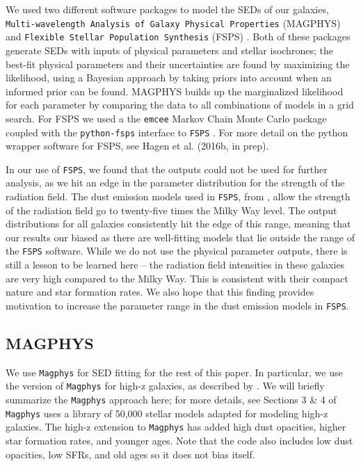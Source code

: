 \documentclass[preprint,natbib209]{aastex}
\begin{document}
We used two different software packages to model the SEDs of our galaxies, \texttt{Multi-wavelength Analysis of Galaxy Physical Properties} (MAGPHYS) \citep{dacunha08, dacunha15} and \texttt{Flexible Stellar Population Synthesis} (FSPS) \citep{conroy09, conroy10}. Both of these packages generate SEDs with inputs of physical parameters and stellar isochrones; the best-fit physical parameters and their uncertainties are found by maximizing the likelihood, using a Bayesian approach by taking priors into account when an informed prior can be found. MAGPHYS builds up the marginalized likelihood for each parameter by comparing the data to all combinations of models in a grid search. For FSPS we used a the \texttt{emcee} Markov Chain Monte Carlo package \citep{emcee} coupled with the \texttt{python-fsps} interface to \texttt{FSPS} \citep{python-fsps}. For more detail on the python wrapper software for FSPS, see Hagen et al. (2016b, in prep). 

In our use of \texttt{FSPS}, we found that the outputs could not be used for further analysis, as we hit an edge in the parameter distribution for the strength of the radiation field. The dust emission models used in \texttt{FSPS}, from \cite{draine07}, allow the strength of the radiation field go to twenty-five times the Milky Way level. The output distributions for all galaxies consistently hit the edge of this range, meaning that our results our biased as there are well-fitting models that lie outside the range of the \texttt{FSPS} software. While we do not use the physical parameter outputs, there is still a lesson to be learned here -- the radiation field intensities in these galaxies are very high compared to the Milky Way. This is consistent with their compact nature and star formation rates. We also hope that this finding provides motivation to increase the parameter range in the dust emission models in \texttt{FSPS}.

\subsection{MAGPHYS}

We use \texttt{Magphys} for SED fitting for the rest of this paper. In particular, we use the version of \texttt{Magphys} for high-z galaxies, as described by \cite{dacunha15}.  We will briefly summarize the \texttt{Magphys} approach here; for more details, see Sections 3 \& 4 of \cite{dacunha15} 
\texttt{Magphys} uses a library of 50,000 stellar models adapted for modeling high-z galaxies. The \cite{dacunha15} high-z extension to \texttt{Magphys} has added high dust opacities, higher star formation rates, and younger ages. Note that the code also includes low dust opacities, low SFRs, and old ages so it does not bias itself. 
\end{document}

